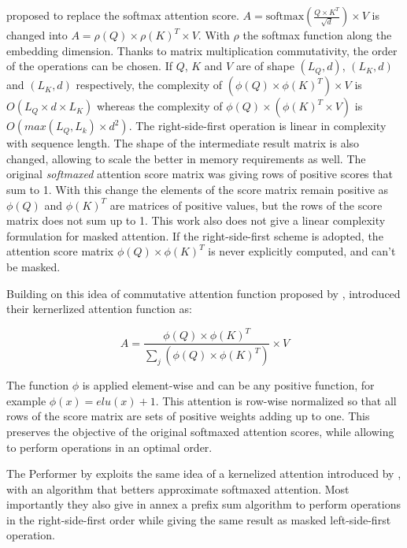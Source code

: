 \citet{shen2020efficient} proposed to
 replace the softmax attention score.
 $A = \mathrm{softmax}\left(\frac{Q \times K^T}{\sqrt{d}}\right) \times V$ is
changed into $A = \rho(Q) \times \rho(K)^T \times V$. With $\rho$
the softmax function along the embedding dimension. Thanks to matrix
multiplication commutativity, the order of the operations can be chosen.
If $Q$, $K$ and $V$ are of shape $(L_Q, d)$, $(L_K, d)$ and
$(L_K, d)$ respectively, the complexity of
$(\phi(Q) \times \phi(K)^T) \times V$ is $O(L_Q \times d \times L_K)$ whereas the complexity of
$\phi(Q) \times (\phi(K)^T \times V)$ is
$O\left(max(L_Q, L_k) \times d^2 \right)$. The right-side-first
operation is linear in complexity with sequence length. The shape of the
intermediate result matrix is also changed, allowing to scale the better
in memory requirements as well. The original \emph{softmaxed} attention score
matrix was giving rows of positive scores that sum to 1. With this
change the elements of the score matrix remain positive as $\phi(Q)$
and $\phi(K)^T$ are matrices of positive values, but the rows of the
score matrix does not sum up to 1. This work also does not give a linear complexity formulation for masked attention. If the right-side-first
scheme is adopted, the attention score matrix
$\phi(Q) \times \phi(K)^T$ is never explicitly computed, and can't be
masked.

Building on this idea of commutative attention function proposed by
\citep{shen2020efficient}, \citet{katharopoulos2020transformers} introduced their kernerlized attention function as:

\begin{equation}
A = \frac{\phi(Q) \times \phi(K)^T}{\sum_j \left( \phi(Q) \times \phi(K)^T \right)} \times V
\end{equation}

The function $\phi$ is applied element-wise and can be any positive
function, for example $\phi(x) = elu(x) + 1$. This attention is
row-wise normalized so that all rows of the score matrix are sets of
positive weights adding up to one. This preserves the objective of the
original softmaxed attention scores, while allowing to perform
operations in an optimal order.

The Performer by \citet{choromanski2021rethinking} exploits the same idea of a kernelized attention introduced
by \citet{katharopoulos2020transformers}, with an algorithm that betters approximate softmaxed attention. Most
importantly they also give in annex a prefix sum algorithm to perform
operations in the right-side-first order while giving the same result as
masked left-side-first operation.

